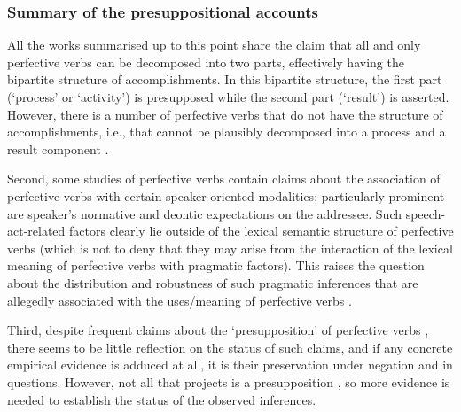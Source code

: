 \subsubsection{Summary of the presuppositional accounts}
All the works summarised up to this point share the claim that all and only perfective verbs  can be decomposed into two parts, effectively having the bipartite structure of accomplishments. In this bipartite structure, the first part (`process' or `activity') is presupposed while the second part (`result') is asserted. However, there is a number of perfective verbs  that do not have the structure of accomplishments, i.e., that cannot be plausibly decomposed into a process and a result component \citep[see][and references therein]{Filip:00, FilipRothstein:05}. 

 Second, some studies of perfective verbs  \citep[here represented by][]{Paducheva:96, Romanova:06} contain claims about the association of perfective verbs  with certain speaker-oriented modalities; particularly prominent are speaker's normative and deontic expectations on the addressee. Such speech-act-related factors clearly lie outside of the lexical semantic structure of perfective verbs  (which is not to deny that they may arise from the interaction of the lexical meaning of perfective verbs  with pragmatic factors). This raises the question about the distribution and robustness of such pragmatic inferences that are allegedly associated with the uses/meaning of perfective verbs . 

 Third, despite frequent claims about the `presupposition' of perfective verbs , there seems to be little reflection on the status of such claims, and if any concrete empirical evidence is adduced at all, it is their preservation under negation and in questions. However, not all that projects is a presupposition \citep[see, e.g.,][]{ChierchiaMcConnell-Ginet:90, Beaver:01, Potts:05}, so more evidence is needed to establish the status of the observed inferences.

